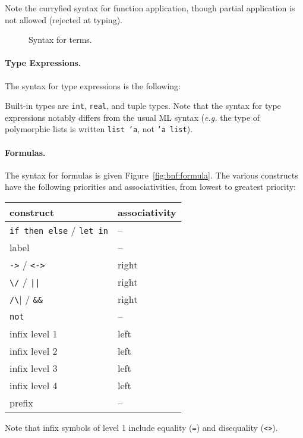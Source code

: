 Note the curryfied syntax for function application, though partial
application is not allowed (rejected at typing).

\begin{figure}
  \begin{center}\framebox{}\end{center}
  \caption{Syntax for terms.}
\label{fig:bnf:term}
\end{figure}

\paragraph{Type Expressions.} The syntax for type expressions is the following:
\begin{center}\framebox{}\end{center}
Built-in types are \texttt{int}, \texttt{real}, and tuple types.
Note that the syntax for type
expressions notably differs from the usual ML syntax (\emph{e.g.} the
type of polymorphic lists is written \texttt{list 'a}, not \texttt{'a list}).

\paragraph{Formulas.}
The syntax for formulas is given Figure~\ref{fig:bnf:formula}.
The various constructs have the following priorities and
associativities, from lowest to greatest priority:
\begin{center}
  \begin{tabular}{|l|l|}
    \hline
    construct & associativity \\
    \hline\hline
    \texttt{if then else} / \texttt{let in} & -- \\
    label & -- \\
    \texttt{->} / \texttt{<->} & right \\
    \verb!\/! / \verb!||! & right \\
    \verb|/\| / \verb!&&! & right \\
    \texttt{not}  & -- \\
    infix level 1 & left \\
    infix level 2 & left \\
    infix level 3 & left \\
    infix level 4 & left \\
    prefix        & --   \\
    \hline
  \end{tabular}
\end{center}
Note that infix symbols of level 1 include equality (\texttt{=}) and
disequality (\texttt{<>}).

